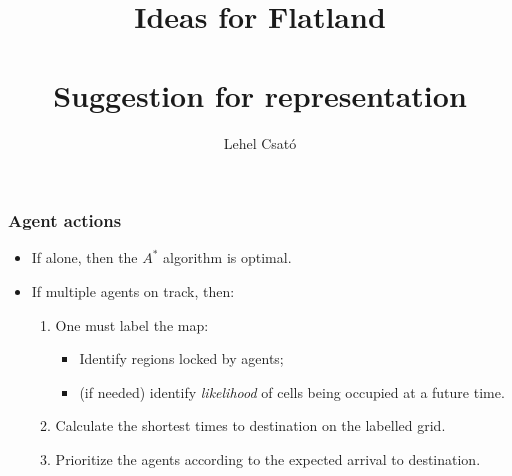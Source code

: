 \documentclass[12pt,aspectratio=169]{beamer}
\title[Flatland]{
	\large Ideas for Flatland\\
	~\\
	\small Suggestion  for representation
}
\author{Lehel Csató}
\institute[UBB]{%
  Faculty of Mathematics and Informatics,\\
  Babe\c{s}--Bolyai University of Cluj-Napoca
}
\begin{document}


\begin{frame}[t]
  \frametitle{Agent actions}


\begin{itemize}
\item If alone, then the $A^*$ algorithm is optimal.
\vfill
\vfill
\item If multiple agents on track, then:
\vfill
  \begin{enumerate}
  \item One must label the \alert{map}: 
    \begin{itemize}
    \item Identify regions locked by agents;
    \item (if needed) identify \emph{likelihood} of cells being occupied at a future time.
    \end{itemize}
\vfill
  \item Calculate the shortest times to destination on the \alert{labelled grid}.
\vfill
  \item Prioritize the agents according to the \alert{expected arrival to destination}.
  \end{enumerate}

\end{itemize}

\vfill

\hfill {}
\vspace*{-0cm}
\end{frame}
\end{document}

